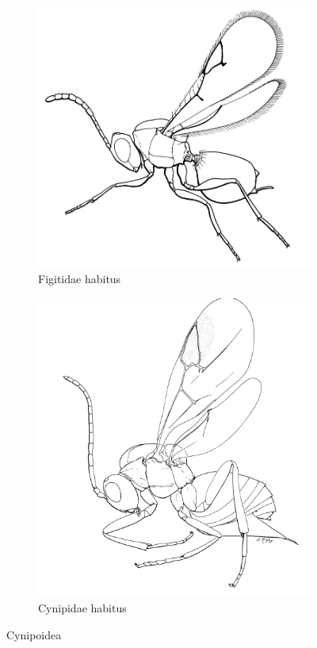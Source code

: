 \documentclass[letterpaper, 11pt]{article}
\begin{document}
\begin{figure}[ht!]
  \centering
\begin{subfigure}[ht!]{0.45\textwidth}
    \includegraphics[width=\textwidth]{FigitidHabitus}
  \caption{Figitidae habitus \citep[][Fig. 195]{goulet1993hymenoptera}}
  \label{fig:figid1}
\end{subfigure}
    \hfill
\begin{subfigure}[ht!]{0.42\textwidth}
    \includegraphics[width=\textwidth]{CynipidHabitus}
  \caption{Cynipidae habitus \citep[][Fig. 197]{goulet1993hymenoptera}}
  \label{fig:cynipid1}
\end{subfigure}
    \caption{Cynipoidea}\label{fig:cynipoids}
\end{figure}
\end{document}
